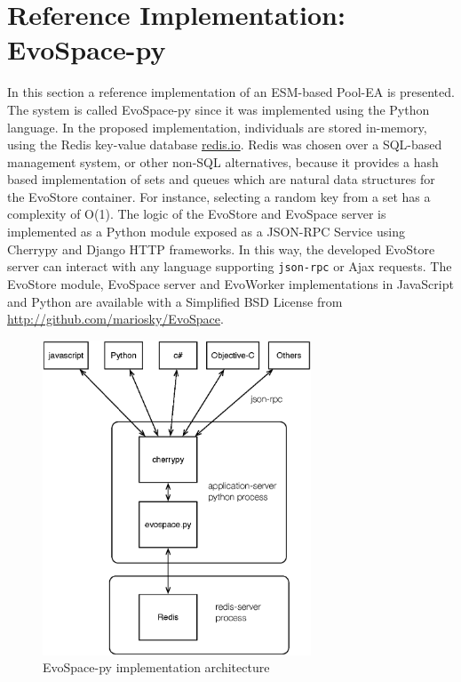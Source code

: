 \section{Reference Implementation: EvoSpace-py}
\label{sec:ref}
In this section a reference implementation of an ESM-based Pool-EA is presented.
The system is called EvoSpace-py since it was implemented using the Python language. 
In the proposed implementation, individuals are stored in-memory, using the Redis key-value database \url{redis.io}. 
Redis was chosen over a SQL-based management system, or other non-SQL
alternatives, because it provides a hash based implementation of sets
and queues which are natural data structures for the EvoStore container.
For instance, selecting a random key from a set has a complexity
of O(1). The logic of the EvoStore and EvoSpace server is implemented as a Python module exposed as a JSON-RPC Service using Cherrypy and Django HTTP frameworks.
In this way, the developed EvoStore server %
can interact with any language supporting {\tt json-rpc} or Ajax requests. The EvoStore module, EvoSpace server and EvoWorker implementations in JavaScript and Python are available with a Simplified BSD License from \url{http://github.com/mariosky/EvoSpace}.

\begin{figure}[t]
    \centering
        \includegraphics[width=8cm]{evospace.eps}
    \caption{EvoSpace-py implementation architecture } %
    \label{fig:evospace}
\end{figure}

